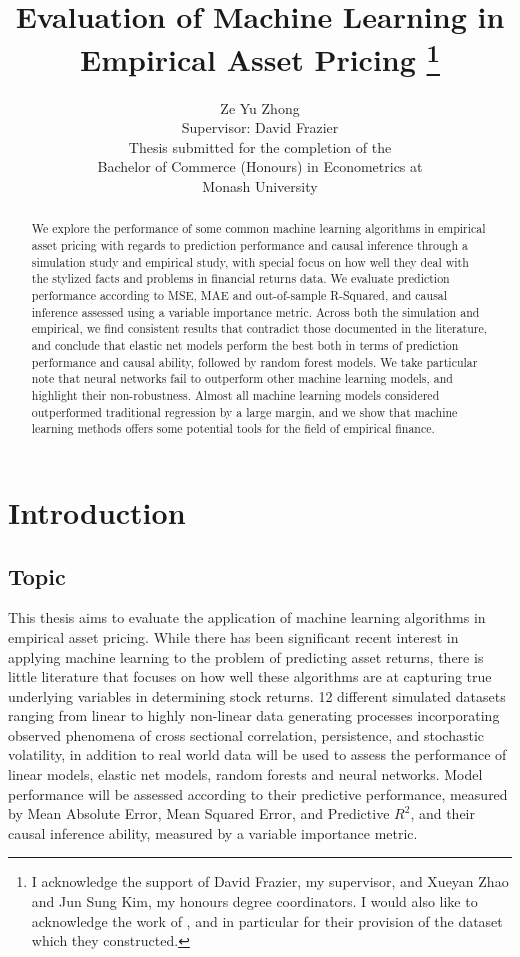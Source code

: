 \documentclass[11pt, a4paper, table]{article}
\title{Evaluation of Machine Learning in Empirical Asset Pricing
\thanks{I acknowledge the support of David Frazier, my supervisor, and Xueyan Zhao and Jun Sung Kim, my honours degree coordinators. I would also like to acknowledge the work of \cite{gu_empirical_2018}, and in particular for their provision of the dataset which they constructed.}
}
\author{Ze Yu Zhong \\
Supervisor: David Frazier \\ 
Thesis submitted for the completion of the \\
Bachelor of Commerce (Honours) in Econometrics at \\
Monash University}
\begin{document}
\maketitle

\begin{abstract}
We explore the performance of some common machine learning algorithms in empirical asset pricing with regards to prediction performance and causal inference through a simulation study and empirical study, with special focus on how well they deal with the stylized facts and problems in financial returns data. We evaluate prediction performance according to MSE, MAE and out-of-sample R-Squared, and causal inference assessed using a variable importance metric. Across both the simulation and empirical, we find consistent results that contradict those documented in the literature, and conclude that elastic net models perform the best both in terms of prediction performance and causal ability, followed by random forest models. We take particular note that neural networks fail to outperform other machine learning models, and highlight their non-robustness. Almost all machine learning models considered outperformed traditional regression by a large margin, and we show that machine learning methods offers some potential tools for the field of empirical finance. 
\end{abstract}

\newpage

\tableofcontents

\newpage


\section{Introduction}

\subsection{Topic}

This thesis aims to evaluate the application of machine learning algorithms in empirical asset pricing. While there has been significant recent interest in applying machine learning to the problem of predicting asset returns, there is little literature that focuses on how well these algorithms are at capturing true underlying variables in determining stock returns. 12 different simulated datasets ranging from linear to highly non-linear data generating processes incorporating observed phenomena of cross sectional correlation, persistence, and stochastic volatility, in addition to real world data will be used to assess the performance of linear models, elastic net models, random forests and neural networks. Model performance will be assessed according to their predictive performance, measured by Mean Absolute Error, Mean Squared Error, and Predictive $R^2$, and their causal inference ability, measured by a variable importance metric.
\end{document}
